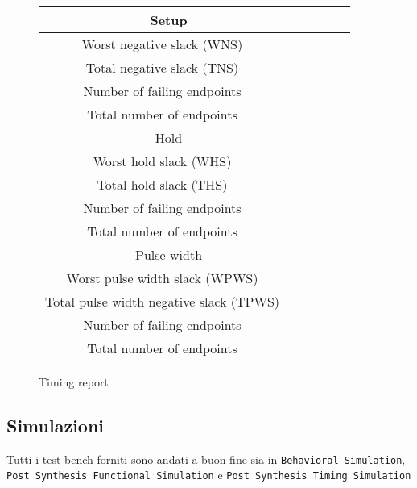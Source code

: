 \begin{figure}[!ht]
    \centering
    \begin{tabular}{|c|c|c|c|c|c|}
        \hline
        \multicolumn{2}{|c|}{Setup}               \\
        \hline
        Worst negative slack (WNS)              & \\
        \hline
        Total negative slack (TNS)              & \\
        \hline
        Number of failing endpoints             & \\
        \hline
        Total number of endpoints               & \\
        \hline
        \multicolumn{2}{|c|}{Hold}                \\
        \hline
        Worst hold slack (WHS)                  & \\
        \hline
        Total hold slack (THS)                  & \\
        \hline
        Number of failing endpoints             & \\
        \hline
        Total number of endpoints               & \\
        \hline
        \multicolumn{2}{|c|}{Pulse width}         \\
        \hline
        Worst pulse width slack (WPWS)          & \\
        \hline
        Total pulse width negative slack (TPWS) & \\
        \hline
        Number of failing endpoints             & \\
        \hline
        Total number of endpoints               & \\
        \hline
    \end{tabular}
    \caption{Timing report}
    \label{table:timingreport}
\end{figure}

\subsection{Simulazioni}

Tutti i test bench forniti sono andati a buon fine sia in \verb|Behavioral Simulation|, \verb|Post Synthesis Functional Simulation| e \verb|Post Synthesis Timing Simulation|